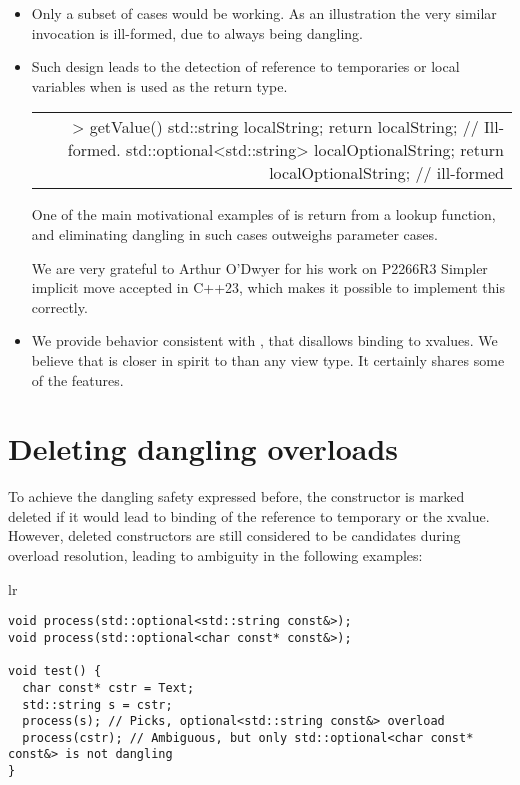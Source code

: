\documentclass[a4paper,10pt,oneside,openany,final,article]{memoir}
\begin{document}
\begin{itemize}
\item
  Only a subset of cases would be working. As an illustration the very similar  invocation is ill-formed, due to always being dangling.

\item
  Such design leads to the detection of reference to temporaries or local variables when  is used as the return type.

  \begin{tabular}{ lr }
  \begin{minipage}[t]{0.45\columnwidth}
    \begin{verbatim}
std::optional<std::string const&> getValue() {
  std::string localString;
  return localString; // Ill-formed.
  std::optional<std::string> localOptionalString;
  return localOptionalString; // ill-formed
}
        \end{verbatim}
      \end{minipage}
\end{tabular}

One of the main motivational examples of  is return from a lookup function, and eliminating dangling in such cases outweighs parameter cases.

We are very grateful to Arthur O'Dwyer for his work on \cite{P2266R3} P2266R3 Simpler implicit move accepted in C++23, which makes it possible to implement this correctly.

\item
  We provide behavior consistent with , that disallows binding to xvalues. We believe that  is closer in spirit to  than any view type. It certainly shares some of the features.
\end{itemize}

\section{Deleting dangling overloads}

To achieve the dangling safety expressed before, the constructor is marked deleted if it would lead to binding of the reference to temporary or the xvalue.
However, deleted constructors are still considered to be candidates during overload resolution, leading to ambiguity in the following examples:

\begin{tabular}{ lr }
  \begin{minipage}[t]{0.45\columnwidth}
    \begin{verbatim}
void process(std::optional<std::string const&>);
void process(std::optional<char const* const&>);

void test() {
  char const* cstr = Text;
  std::string s = cstr;
  process(s); // Picks, optional<std::string const&> overload
  process(cstr); // Ambiguous, but only std::optional<char const* const&> is not dangling
}
\end{verbatim}
\end{minipage}
\end{tabular}
\end{document}
